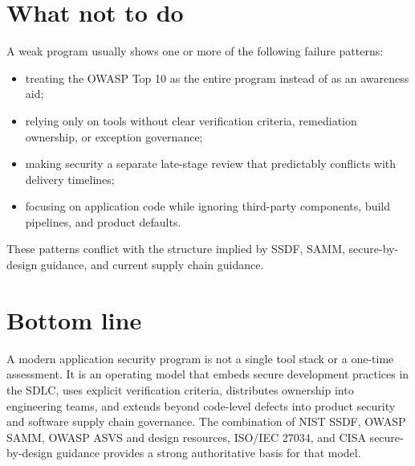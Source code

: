 \documentclass[11pt]{article}
\begin{document}
\section{What not to do}
A weak program usually shows one or more of the following failure patterns:
\begin{itemize}
  \item treating the OWASP Top 10 as the entire program instead of as an awareness aid;
  \item relying only on tools without clear verification criteria, remediation ownership, or exception governance;
  \item making security a separate late-stage review that predictably conflicts with delivery timelines;
  \item focusing on application code while ignoring third-party components, build pipelines, and product defaults.
\end{itemize}
These patterns conflict with the structure implied by SSDF, SAMM, secure-by-design guidance, and current supply chain guidance.\cite{owasp-top10-program,nist-ssdf,owasp-samm,cisa-sbd,nist-supplychain}

\section{Bottom line}
A modern application security program is not a single tool stack or a one-time assessment. It is an operating model that embeds secure development practices in the SDLC, uses explicit verification criteria, distributes ownership into engineering teams, and extends beyond code-level defects into product security and software supply chain governance. The combination of NIST SSDF, OWASP SAMM, OWASP ASVS and design resources, ISO/IEC 27034, and CISA secure-by-design guidance provides a strong authoritative basis for that model.\cite{nist-ssdf,owasp-samm,owasp-asvs,iso-27034,cisa-sbd}
\end{document}
